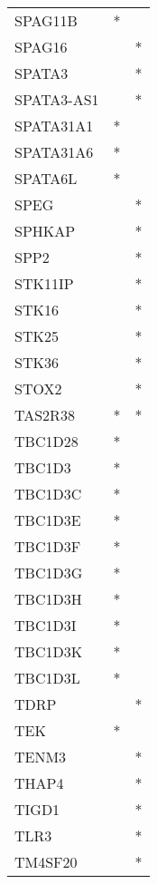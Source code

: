 \begin{longtable}{lcc}
SPAG11B        &         * &         \\
SPAG16         &           &       * \\
SPATA3         &           &       * \\
SPATA3-AS1     &           &       * \\
SPATA31A1      &         * &         \\
SPATA31A6      &         * &         \\
SPATA6L        &         * &         \\
SPEG           &           &       * \\
SPHKAP         &           &       * \\
SPP2           &           &       * \\
STK11IP        &           &       * \\
STK16          &           &       * \\
STK25          &           &       * \\
STK36          &           &       * \\
STOX2          &           &       * \\
TAS2R38        &         * &       * \\
TBC1D28        &         * &         \\
TBC1D3         &         * &         \\
TBC1D3C        &         * &         \\
TBC1D3E        &         * &         \\
TBC1D3F        &         * &         \\
TBC1D3G        &         * &         \\
TBC1D3H        &         * &         \\
TBC1D3I        &         * &         \\
TBC1D3K        &         * &         \\
TBC1D3L        &         * &         \\
TDRP           &           &       * \\
TEK            &         * &         \\
TENM3          &           &       * \\
THAP4          &           &       * \\
TIGD1          &           &       * \\
TLR3           &           &       * \\
TM4SF20        &           &       * \\

\end{longtable}
